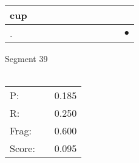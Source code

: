 \documentclass[landscape]{article}
\newcommand{\ssp}{\hspace{2pt}}
\newcommand{\mex}{\cellcolor{g}$\bullet$}
\begin{document}
\begin{tabular}{|l|p{10pt}|p{10pt}|p{10pt}|p{10pt}|p{10pt}|p{10pt}|p{10pt}|p{10pt}|p{10pt}|p{10pt}|}
\hline
\ssp cup \ssp&\hspace{2pt}&\hspace{2pt}&\hspace{2pt}&\hspace{2pt}&\hspace{2pt}&\hspace{2pt}&\hspace{2pt}&\hspace{2pt}&\hspace{2pt}&\hspace{2pt}\\
\hline
\ssp \cellcolor{ref9}. \ssp&\hspace{2pt}&\hspace{2pt}&\hspace{2pt}&\hspace{2pt}&\hspace{2pt}&\hspace{2pt}&\hspace{2pt}&\hspace{2pt}&\hspace{2pt}&\hspace{2pt}\mex\\
\hline
\end{tabular}

\vspace{6pt}
\noindent Segment 39\\\\
\noindent\begin{tabular}{lm{12pt}r}
\hline
P:&&0.185\\
R:&&0.250\\
Frag:&&0.600\\
Score:&&0.095\\
\end{tabular}

\newpage
\end{document}
